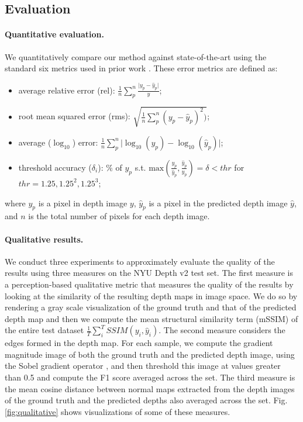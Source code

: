 \documentclass[10pt,twocolumn,letterpaper]{article}
\begin{document}
\subsection{Evaluation} 


\paragraph{Quantitative evaluation.} We quantitatively compare our method against state-of-the-art using the standard six metrics used in prior work \cite{Eigen2014}. These error metrics are defined as:
\begin{itemize}
    \item average relative error (rel): $\frac{1}{n}\sum_p^n \frac{\lvert y_p-\hat{y}_p \rvert}{y}$;
    \item root mean squared error (rms): $\sqrt{\frac{1}{n}\sum_p^n (y_p-\hat{y}_p)^2)}$;
    \item average ($\log_{10}$) error: $\frac{1}{n}\sum_p^n \lvert \log_{10}(y_p)-\log_{10}(\hat{y}_p) \rvert$;
    \item threshold accuracy ($\delta_i$): $\%$ of $y_p$ s.t. $\text{max}(\frac{y_p}{\hat{y}_p},\frac{\hat{y}_p}{y_p}) = \delta < thr$ for $thr=1.25,1.25^2,1.25^3$;
\end{itemize}
where $y_p$ is a pixel in depth image $y$, $\hat{y}_p$ is a pixel in the predicted depth image $\hat{y}$, and $n$ is the total number of pixels for each depth image.

\paragraph{Qualitative results.} We conduct three experiments to approximately evaluate the quality of the results using three measures on the NYU Depth v2 test set. The first measure is a perception-based qualitative metric that measures the quality of the results by looking at the similarity of the resulting depth maps in image space. We do so by rendering a gray scale visualization of the ground truth and that of the predicted depth map and then we compute the mean structural similarity term (mSSIM) of the entire test dataset $\frac{1}{T} \sum_i^T {SSIM}(y_i,\hat{y}_i)$. The second measure considers the edges formed in the depth map. For each sample, we compute the gradient magnitude image of both the ground truth and the predicted depth image, using the Sobel gradient operator \cite{Sobel1968}, and then threshold this image at values greater than 0.5 and compute the F1 score averaged across the set. The third measure is the mean cosine distance between normal maps extracted from the depth images of the ground truth and the predicted depths also averaged across the set. Fig. \ref{fig:qualitative} shows visualizations of some of these measures.
\end{document}
